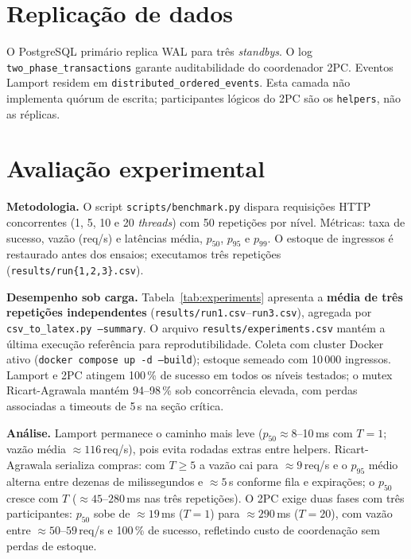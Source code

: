 \documentclass[conference]{IEEEtran}
\begin{document}
\section{Replicação de dados}

O PostgreSQL primário replica WAL para tr\^es \emph{standbys}. O log
\texttt{two\_phase\_transactions} garante auditabilidade do coordenador 2PC.
Eventos Lamport residem em \texttt{distributed\_ordered\_events}. Esta camada
não implementa quórum de escrita; participantes lógicos do 2PC são os
\texttt{helpers}, não as réplicas.

\section{Avaliação experimental}
\label{sec:exp}



\textbf{Metodologia.} O script \texttt{scripts/benchmark.py} dispara
requisições HTTP concorrentes (1, 5, 10 e 20 \emph{threads}) com 50
repetições por nível. Métricas: taxa de sucesso, vazão (req/s) e latências
média, $p_{50}$, $p_{95}$ e $p_{99}$. O estoque de ingressos é restaurado
antes dos ensaios; executamos três repetições
(\texttt{results/run\{1,2,3\}.csv}).

\textbf{Desempenho sob carga.} Tabela~\ref{tab:experiments} apresenta a
\textbf{m\'edia de tr\^es repeti\c{c}\~oes independentes}
(\texttt{results/run1.csv}--\texttt{run3.csv}), agregada por
\texttt{csv\_to\_latex.py --summary}. O arquivo
\texttt{results/experiments.csv} mant\'em a \'ultima execu\c{c}\~ao
referência para reprodutibilidade. Coleta com cluster Docker ativo
(\texttt{docker compose up -d --build}); estoque semeado com 10\,000
ingressos. Lamport e 2PC atingem 100\,\% de sucesso em todos os n\'iveis
testados; o mutex Ricart-Agrawala mant\'em 94--98\,\% sob concorr\^encia
elevada, com perdas associadas a timeouts de 5\,s na se\c{c}\~ao cr\'itica.

\textbf{An\'alise.} Lamport permanece o caminho mais leve ($p_{50}\approx
8$--10\,ms com $T{=}1$; vaz\~ao m\'edia $\approx 116$\,req/s), pois evita
rodadas extras entre helpers. Ricart-Agrawala serializa compras: com
$T\geq 5$ a vaz\~ao cai para $\approx 9$\,req/s e o $p_{95}$ m\'edio
alterna entre dezenas de milissegundos e $\approx 5$\,s conforme fila e
expira\c{c}\~oes; o $p_{50}$ cresce com $T$ ($\approx 45$--$280$\,ms nas
tr\^es repeti\c{c}\~oes). O 2PC exige duas fases com tr\^es participantes:
$p_{50}$ sobe de $\approx 19$\,ms ($T{=}1$) para $\approx 290$\,ms
($T{=}20$), com vaz\~ao entre $\approx 50$--$59$\,req/s e 100\,\% de
sucesso, refletindo custo de coordena\c{c}\~ao sem perdas de estoque.
\end{document}
